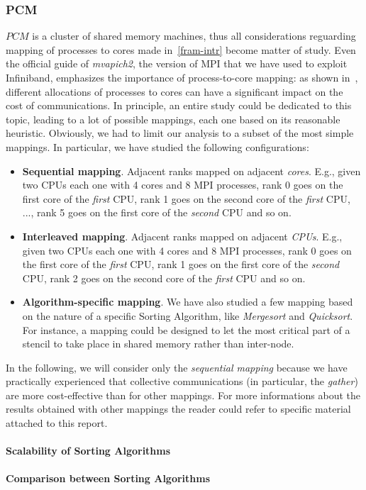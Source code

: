 \subsubsection{PCM}
$PCM$ is a cluster of shared memory machines, thus all considerations reguarding mapping of processes to cores made in~\ref{fram-intr} become matter of study. Even the official guide of \textit{mvapich2}, the version of MPI that we have used to exploit Infiniband, emphasizes the importance of process-to-core mapping: as shown in~\cite{MVAPICH2-MAPPING}, different allocations of processes to cores can have a significant impact on the cost of communications. In principle, an entire study could be dedicated to this topic, leading to a lot of possible mappings, each one based on its reasonable heuristic. Obviously, we had to limit our analysis to a subset of the most simple mappings. In particular, we have studied the following configurations:   
\begin{itemize}
\item \textbf{Sequential mapping}. Adjacent ranks mapped on adjacent \textit{cores}. E.g., given two CPUs each one with 4 cores and 8 MPI processes, rank 0 goes on the first core of the \textit{first} CPU, rank 1 goes on the second core of the \textit{first} CPU, ..., rank 5 goes on the first core of the \textit{second} CPU and so on.
\item \textbf{Interleaved mapping}. Adjacent ranks mapped on adjacent \textit{CPUs}. E.g., given two CPUs each one with 4 cores and 8 MPI processes, rank 0 goes on the first core of the \textit{first} CPU, rank 1 goes on the first core of the \textit{second} CPU, rank 2 goes on the second core of the \textit{first} CPU and so on.
\item \textbf{Algorithm-specific mapping}. We have also studied a few mapping based on the nature of a specific Sorting Algorithm, like \textit{Mergesort} and \textit{Quicksort}. For instance, a mapping could be designed to let the most critical part of a stencil to take place in shared memory rather than inter-node.  
\end{itemize}
In the following, we will consider only the \textit{sequential mapping} because we have practically experienced that collective communications (in particular, the \textit{gather}) are more cost-effective than for other mappings. For more informations about the results obtained with other mappings the reader could refer to specific material attached to this report.


\paragraph{Scalability of Sorting Algorithms}

\paragraph{Comparison between Sorting Algorithms}

\clearpage